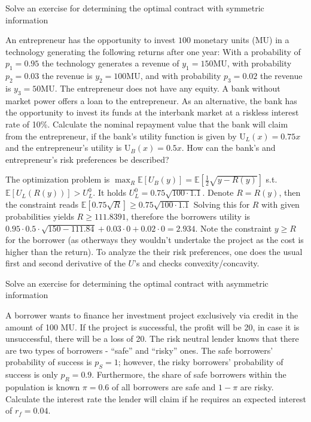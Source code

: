 Solve an exercise for determining the optimal contract with symmetric information

An entrepreneur has the opportunity to invest \( 100 \) monetary units (MU) in a technology generating the following
returns after one year: With a probability of \( p_1 = 0.95 \)  the technology generates a revenue of \( y_1 = 150 \text{MU} \), with
probability \( p_2 = 0.03 \) the revenue is \( y_2 = 100 \text{MU} \), and with probability \( p_3 = 0.02 \) the revenue is \( y_3 = 50 \text{MU} \). 
The entrepreneur does not have any equity. A bank without market power offers a loan to the entrepreneur. As an
alternative, the bank has the opportunity to invest its funds at the interbank market at a riskless interest rate of 10\%. 
Calculate the nominal repayment value that the bank will claim from the entrepreneur, if the bank’s utility function is given by \( \text{U}_L(x) = 0.75x \) and the entrepreneur’s utility is \( \text{U}_B(x) = 0.5x \).
How can the bank’s and entrepreneur’s risk preferences be described?

The optimization problem is
\( \max_R \mathbb{E}[U_B(y)] = \mathbb{E}[\frac{1}{2}\sqrt{y - R(y)}] \) s.t. \( \mathbb{E}[U_L(R(y))] > U^0_L \).
It holds \( U^0_L = 0.75\sqrt{100\cdot 1.1} \). Denote \( R = R(y) \), then the constraint reads 
\( \mathbb{E}[0.75\sqrt{R}] \geq 0.75\sqrt{100\cdot 1.1} \)
Solving this for \( R \) with given probabilities yields \( R \geq 111.8391 \), therefore the borrowers utility
is
\( 0.95 \cdot 0.5 \cdot \sqrt{150 - 111.84} + 0.03\cdot 0 + 0.02 \cdot 0 = 2.934 \).
Note the constraint \( y \geq R \) for the borrower (as otherways they wouldn't undertake the project as the cost is higher than the return).
To analyze the their risk preferences, one does the usual first and second derivative of the \( U \)'s and checks convexity/concavity.


Solve an exercise for determining the optimal contract with asymmetric information

A borrower wants to finance her investment project exclusively via credit in the amount of 100 MU. If the project
is successful, the profit will be 20, in case it is unsuccessful, there will be a loss of 20. The risk neutral lender
knows that there are two types of borrowers - “safe” and “risky” ones. The safe borrowers’ probability of success
is \( p_S = 1 \); however, the risky borrowers’ probability of success is only \( p_R = 0.9 \). Furthermore, the share of safe borrowers
within the population is known \( \pi = 0.6 \) of all borrowers are safe and \( 1 - \pi \) are risky.
Calculate the interest rate the lender will claim if he requires an expected interest of \( r_f = 0.04 \).

